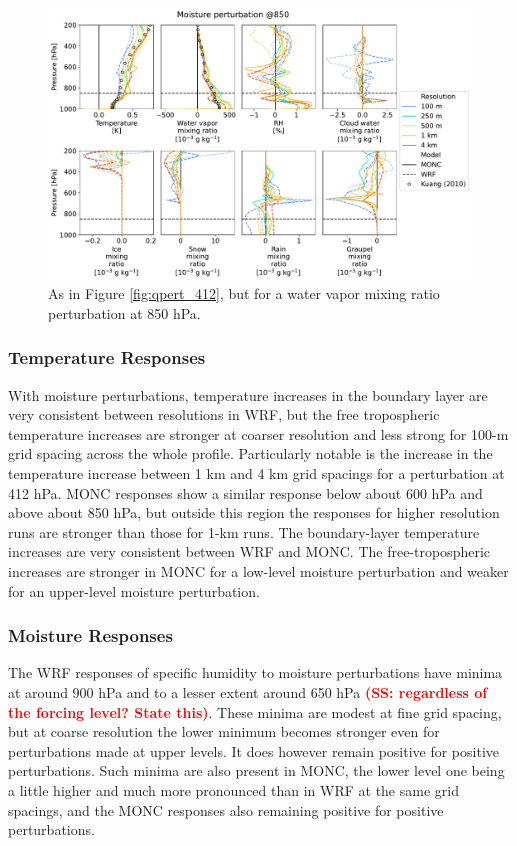 \documentclass[draft]{agujournal2019}
\newcommand{\todo}[1]{\textcolor{red}{\textbf{(#1)}}}
\begin{document}
\begin{figure}[pth]
    \noindent\includegraphics[width=\textwidth]{figures/pert_diffs_q_0.0002_@850}
    \caption{As in Figure \ref{fig:qpert_412}, but for a water vapor mixing
    ratio perturbation at 850 hPa.}
    \label{fig:qpert_850}
\end{figure}

\subsubsection{Temperature Responses}

With moisture perturbations, temperature increases in the boundary layer are
very consistent between resolutions in WRF, but the free tropospheric
temperature increases are stronger at coarser resolution and less strong for
100-m grid spacing across the whole profile. Particularly notable is the
increase in the temperature increase between 1 km and 4 km grid spacings for a
perturbation at 412 hPa. MONC responses show a similar response below about 600
hPa and above about 850 hPa, but outside this region the responses for higher
resolution runs are stronger than those for 1-km runs. The boundary-layer
temperature increases are very consistent between WRF and MONC. The
free-tropospheric increases are stronger in MONC for a low-level moisture
perturbation and weaker for an upper-level moisture perturbation.

\subsubsection{Moisture Responses}

The WRF responses of specific humidity to moisture perturbations have minima at
around 900 hPa and to a lesser extent around 650 hPa \todo{SS: regardless of the
forcing level?  State this}. These minima are modest at fine grid spacing, but
at coarse resolution the lower minimum becomes stronger even for perturbations
made at upper levels. It does however remain positive for positive
perturbations. Such minima are also present in MONC, the lower level one being a
little higher and much more pronounced than in WRF at the same grid spacings,
and the MONC responses also remaining positive for positive perturbations.
\end{document}
